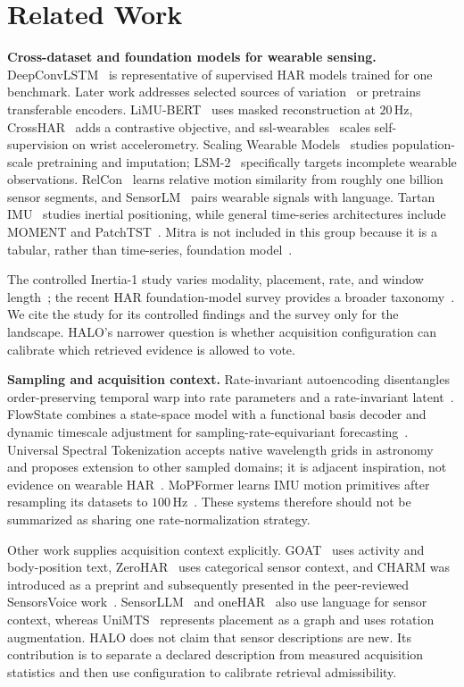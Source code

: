 \section{Related Work}
\label{sec:related}

\textbf{Cross-dataset and foundation models for wearable sensing.}
DeepConvLSTM~\cite{deepconvlstm} is representative of supervised HAR models trained for one
benchmark. Later work addresses selected sources of variation~\cite{cosmo,unihar,clusterfl} or
pretrains transferable encoders. LiMU-BERT~\cite{limubert} uses masked reconstruction at
$20$\,Hz, CrossHAR~\cite{crosshar} adds a contrastive objective, and
ssl-wearables~\cite{sslwearables} scales self-supervision on wrist accelerometry. Scaling Wearable
Models~\cite{lsm1} studies population-scale pretraining and imputation; LSM-2~\cite{lsm2}
specifically targets incomplete wearable observations. RelCon~\cite{relcon} learns relative motion
similarity from roughly one billion sensor segments, and SensorLM~\cite{sensorlm} pairs wearable
signals with language. Tartan IMU~\cite{tartanimu} studies inertial positioning, while general
time-series architectures include MOMENT and PatchTST~\cite{moment,patchtst}. Mitra is not included
in this group because it is a tabular, rather than time-series, foundation model~\cite{mitra}.

The controlled Inertia-1 study varies modality, placement, rate, and window length~\cite{inertia1};
the recent HAR foundation-model survey provides a broader taxonomy~\cite{harfmsurvey}. We cite the
study for its controlled findings and the survey only for the landscape. HALO's narrower question is
whether acquisition configuration can calibrate which retrieved evidence is allowed to vote.

\textbf{Sampling and acquisition context.}
Rate-invariant autoencoding disentangles order-preserving temporal warp into rate parameters and a
rate-invariant latent~\cite{rateinvae}. FlowState combines a state-space model with a functional
basis decoder and dynamic timescale adjustment for sampling-rate-equivariant
forecasting~\cite{flowstate}. Universal Spectral Tokenization accepts native wavelength grids in
astronomy and proposes extension to other sampled domains; it is adjacent inspiration, not evidence
on wearable HAR~\cite{spectraltok}. MoPFormer learns IMU motion primitives after resampling its
datasets to $100$\,Hz~\cite{mopformer}. These systems therefore should not be summarized as sharing
one rate-normalization strategy.

Other work supplies acquisition context explicitly. GOAT~\cite{goat} uses activity and body-position
text, ZeroHAR~\cite{zerohar} uses categorical sensor context, and CHARM was introduced as a preprint
and subsequently presented in the peer-reviewed SensorsVoice work~\cite{charm,sensorsvoice}.
SensorLLM~\cite{sensorllm} and oneHAR~\cite{onehar} also use language for sensor context, whereas
UniMTS~\cite{unimts} represents placement as a graph and uses rotation augmentation. HALO does not
claim that sensor descriptions are new. Its contribution is to separate a declared description
from measured acquisition statistics and then use configuration to calibrate retrieval
admissibility.

